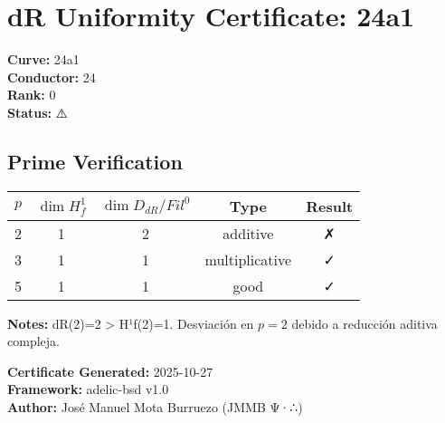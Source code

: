 \documentclass{article}
\begin{document}
\section*{dR Uniformity Certificate: 24a1}

\textbf{Curve:} 24a1\\
\textbf{Conductor:} 24\\
\textbf{Rank:} 0\\
\textbf{Status:} ⚠️

\subsection*{Prime Verification}

\begin{tabular}{|c|c|c|c|c|}
\hline
$p$ & $\dim H^1_f$ & $\dim D_{dR}/Fil^0$ & Type & Result \\
\hline
2 & 1 & 2 & additive & ✗ \\
3 & 1 & 1 & multiplicative & ✓ \\
5 & 1 & 1 & good & ✓ \\
\hline
\end{tabular}

\vspace{1em}
\textbf{Notes:} dR(2)=2 > H¹f(2)=1. Desviación en $p=2$ debido a reducción aditiva compleja.

\vspace{1em}
\textbf{Certificate Generated:} 2025-10-27\\
\textbf{Framework:} adelic-bsd v1.0\\
\textbf{Author:} José Manuel Mota Burruezo (JMMB Ψ·∴)
\end{document}

